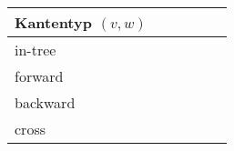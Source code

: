 \begin{expandtable}
\begin{tabularx}{\linewidth}{|X|XIXIX|}
	\hline
	Kantentyp $(v, w)$ &  &  &  \\
	\hline
	in-tree &  &  &  \\
	\grayhline
	forward &  &  &  \\
	\grayhline
	backward &  &  &  \\
	\grayhline
	cross &  &  &  \\
	\hline
\end{tabularx}
\end{expandtable}
